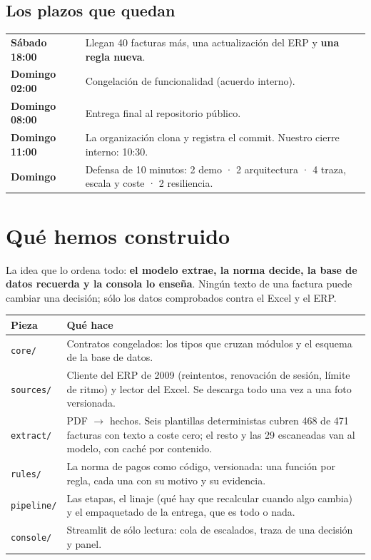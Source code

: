 \documentclass[11pt,a4paper]{article}
\newcommand{\cmd}[1]{\texttt{\small #1}}
\begin{document}
\subsection{Los plazos que quedan}

\begin{center}
\begin{tabularx}{\linewidth}{lX}
\toprule
\textbf{Sábado 18:00} & Llegan 40 facturas más, una actualización del ERP y \textbf{una regla nueva}. \\
\textbf{Domingo 02:00} & Congelación de funcionalidad (acuerdo interno). \\
\textbf{Domingo 08:00} & Entrega final al repositorio público. \\
\textbf{Domingo 11:00} & La organización clona y registra el commit. Nuestro cierre interno: 10:30. \\
\textbf{Domingo} & Defensa de 10 minutos: 2 demo · 2 arquitectura · 4 traza, escala y coste · 2 resiliencia. \\
\bottomrule
\end{tabularx}
\end{center}

\section{Qué hemos construido}

La idea que lo ordena todo: \textbf{el modelo extrae, la norma decide, la base de datos recuerda y la consola
lo enseña}. Ningún texto de una factura puede cambiar una decisión; sólo los datos comprobados contra el
Excel y el ERP.

\begin{center}
\begin{tabularx}{\linewidth}{lX}
\toprule
\textbf{Pieza} & \textbf{Qué hace} \\
\midrule
\cmd{core/} & Contratos congelados: los tipos que cruzan módulos y el esquema de la base de datos. \\
\cmd{sources/} & Cliente del ERP de 2009 (reintentos, renovación de sesión, límite de ritmo) y lector del Excel. Se descarga todo una vez a una foto versionada. \\
\cmd{extract/} & PDF $\rightarrow$ hechos. Seis plantillas deterministas cubren 468 de 471 facturas con texto a coste cero; el resto y las 29 escaneadas van al modelo, con caché por contenido. \\
\cmd{rules/} & La norma de pagos como código, versionada: una función por regla, cada una con su motivo y su evidencia. \\
\cmd{pipeline/} & Las etapas, el linaje (qué hay que recalcular cuando algo cambia) y el empaquetado de la entrega, que es todo o nada. \\
\cmd{console/} & Streamlit de sólo lectura: cola de escalados, traza de una decisión y panel. \\
\bottomrule
\end{tabularx}
\end{center}
\end{document}
